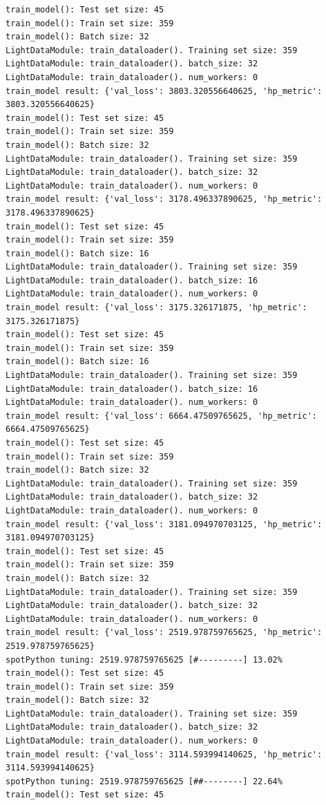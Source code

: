 \documentclass[
  letterpaper,
  DIV=11,
  numbers=noendperiod]{scrreprt}
\begin{document}
\begin{verbatim}
train_model(): Test set size: 45
train_model(): Train set size: 359
train_model(): Batch size: 32
LightDataModule: train_dataloader(). Training set size: 359
LightDataModule: train_dataloader(). batch_size: 32
LightDataModule: train_dataloader(). num_workers: 0
train_model result: {'val_loss': 3803.320556640625, 'hp_metric': 3803.320556640625}
train_model(): Test set size: 45
train_model(): Train set size: 359
train_model(): Batch size: 32
LightDataModule: train_dataloader(). Training set size: 359
LightDataModule: train_dataloader(). batch_size: 32
LightDataModule: train_dataloader(). num_workers: 0
train_model result: {'val_loss': 3178.496337890625, 'hp_metric': 3178.496337890625}
train_model(): Test set size: 45
train_model(): Train set size: 359
train_model(): Batch size: 16
LightDataModule: train_dataloader(). Training set size: 359
LightDataModule: train_dataloader(). batch_size: 16
LightDataModule: train_dataloader(). num_workers: 0
train_model result: {'val_loss': 3175.326171875, 'hp_metric': 3175.326171875}
train_model(): Test set size: 45
train_model(): Train set size: 359
train_model(): Batch size: 16
LightDataModule: train_dataloader(). Training set size: 359
LightDataModule: train_dataloader(). batch_size: 16
LightDataModule: train_dataloader(). num_workers: 0
train_model result: {'val_loss': 6664.47509765625, 'hp_metric': 6664.47509765625}
train_model(): Test set size: 45
train_model(): Train set size: 359
train_model(): Batch size: 32
LightDataModule: train_dataloader(). Training set size: 359
LightDataModule: train_dataloader(). batch_size: 32
LightDataModule: train_dataloader(). num_workers: 0
train_model result: {'val_loss': 3181.094970703125, 'hp_metric': 3181.094970703125}
train_model(): Test set size: 45
train_model(): Train set size: 359
train_model(): Batch size: 32
LightDataModule: train_dataloader(). Training set size: 359
LightDataModule: train_dataloader(). batch_size: 32
LightDataModule: train_dataloader(). num_workers: 0
train_model result: {'val_loss': 2519.978759765625, 'hp_metric': 2519.978759765625}
spotPython tuning: 2519.978759765625 [#---------] 13.02% 
train_model(): Test set size: 45
train_model(): Train set size: 359
train_model(): Batch size: 32
LightDataModule: train_dataloader(). Training set size: 359
LightDataModule: train_dataloader(). batch_size: 32
LightDataModule: train_dataloader(). num_workers: 0
train_model result: {'val_loss': 3114.593994140625, 'hp_metric': 3114.593994140625}
spotPython tuning: 2519.978759765625 [##--------] 22.64% 
train_model(): Test set size: 45

\end{verbatim}
\end{document}
